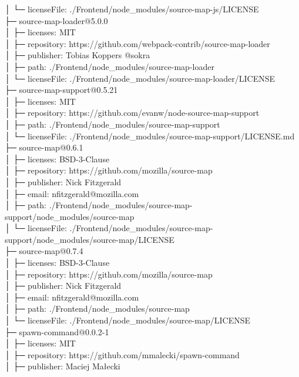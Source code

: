 │  └─ licenseFile: ./Frontend/node\_modules/source-map-js/LICENSE\\
├─ source-map-loader@5.0.0\\
│  ├─ licenses: MIT\\
│  ├─ repository: https://github.com/webpack-contrib/source-map-loader\\
│  ├─ publisher: Tobias Koppers @sokra\\
│  ├─ path: ./Frontend/node\_modules/source-map-loader\\
│  └─ licenseFile: ./Frontend/node\_modules/source-map-loader/LICENSE\\
├─ source-map-support@0.5.21\\
│  ├─ licenses: MIT\\
│  ├─ repository: https://github.com/evanw/node-source-map-support\\
│  ├─ path: ./Frontend/node\_modules/source-map-support\\
│  └─ licenseFile: ./Frontend/node\_modules/source-map-support/LICENSE.md\\
├─ source-map@0.6.1\\
│  ├─ licenses: BSD-3-Clause\\
│  ├─ repository: https://github.com/mozilla/source-map\\
│  ├─ publisher: Nick Fitzgerald\\
│  ├─ email: nfitzgerald@mozilla.com\\
│  ├─ path: ./Frontend/node\_modules/source-map-support/node\_modules/source-map\\
│  └─ licenseFile: ./Frontend/node\_modules/source-map-support/node\_modules/source-map/LICENSE\\
├─ source-map@0.7.4\\
│  ├─ licenses: BSD-3-Clause\\
│  ├─ repository: https://github.com/mozilla/source-map\\
│  ├─ publisher: Nick Fitzgerald\\
│  ├─ email: nfitzgerald@mozilla.com\\
│  ├─ path: ./Frontend/node\_modules/source-map\\
│  └─ licenseFile: ./Frontend/node\_modules/source-map/LICENSE\\
├─ spawn-command@0.0.2-1\\
│  ├─ licenses: MIT\\
│  ├─ repository: https://github.com/mmalecki/spawn-command\\
│  ├─ publisher: Maciej Małecki\\
